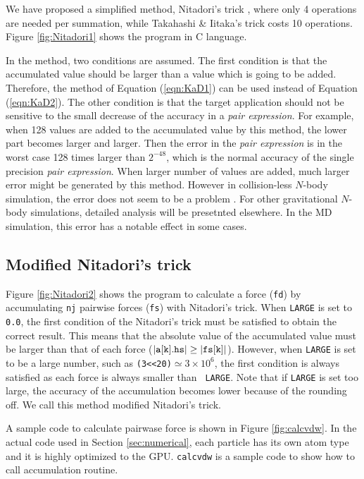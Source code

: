 We have proposed a simplified method, Nitadori's trick
\cite{Nitadori}, where only 4 operations are needed per summation,
while Takahashi \& Iitaka's trick costs 10 operations.  Figure
\ref{fig:Nitadori1} shows the program in C language.

In the method, two conditions are assumed. The first condition is that
the accumulated value should be larger than a value which is going to
be added. Therefore, the method of Equation (\ref{eqn:KaD1}) can be
used instead of Equation (\ref{eqn:KaD2}). The other condition is that
the target application should not be sensitive to the small decrease
of the accuracy in a {\it pair expression}.  For example, when 128
values are added to the accumulated value by this method, the lower
part becomes larger and larger.  Then the error in the {\it pair
expression} is in the worst case 128 times larger than $2^{-48}$,
which is the normal accuracy of the single precision {\it pair
expression}. When larger number of values are added, much larger error
might be generated by this method. However in collision-less $N$-body
simulation, the error does not seem to be a problem
\cite{Hamada1}. For other gravitational $N$-body simulations, detailed
analysis will be presetnted elsewhere.  In the MD simulation,
this error has a notable effect in some cases.

\subsection{Modified Nitadori's trick}

Figure \ref{fig:Nitadori2} shows the program to calculate a force
({\tt fd}) by accumulating {\tt nj} pairwise forces ({\tt fs}) with
Nitadori's trick. 
When {\tt LARGE} is set to {\tt 0.0}, the first
condition of the Nitadori's trick must be satisfied to obtain the
correct result. This means that the absolute value of the accumulated
value must be larger than that of each force ($|{\tt a[k].hs}|\geq |{\tt
fs[k]}|$). However, when {\tt LARGE} is set to be a large number,
such as {\tt (3<<20)}$\simeq 3 \times 10^6$, the first condition is
always satisfied as each force is always smaller than {\tt
LARGE}. Note that if {\tt LARGE} is set too large, the
accuracy of the accumulation becomes lower because of the rounding
off. We call this method modified Nitadori's trick. 

A sample code to calculate pairwase force is shown in Figure \ref{fig:calcvdw}.
In the actual code used in Section \ref{sec:numerical}, 
each particle has its own atom type and it is highly optimized to the GPU.
{\tt calcvdw} is a sample code to show how to call accumulation
routine.

